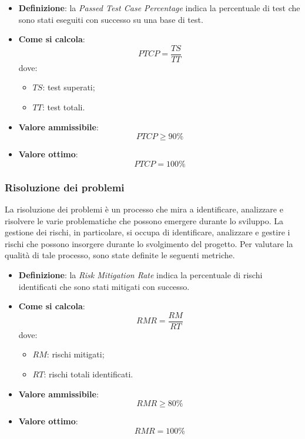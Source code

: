 \begin{itemize}
	\item \textbf{Definizione}: la \textit{Passed Test Case Percentage} indica la percentuale di test che sono stati eseguiti con successo su una base di test.
	\item \textbf{Come si calcola}: \begin{equation*}PTCP = \frac{TS}{TT}\end{equation*} dove:
		\begin{itemize}
			\item $TS$: test superati;
			\item $TT$: test totali.
		\end{itemize}
	\item \textbf{Valore ammissibile}: \begin{equation*}PTCP \geq 90\%\end{equation*}
	\item \textbf{Valore ottimo}: \begin{equation*}PTCP = 100\%\end{equation*}
\end{itemize}



\subsubsection{Risoluzione dei problemi}
La risoluzione dei problemi è un processo che mira a identificare, analizzare e risolvere le varie problematiche che possono emergere durante lo sviluppo. La gestione dei rischi, in particolare, si occupa di identificare, analizzare e gestire i rischi che possono insorgere durante lo svolgimento del progetto. Per valutare la qualità di tale processo, sono state definite le seguenti metriche.

\begin{itemize}
	\item \textbf{Definizione}: la \textit{Risk Mitigation Rate} indica la percentuale di rischi identificati che sono stati mitigati con successo.
	\item \textbf{Come si calcola}: \begin{equation*}RMR = \frac{RM}{RT}\end{equation*} dove:
		\begin{itemize}
			\item $RM$: rischi mitigati;
			\item $RT$: rischi totali identificati.
		\end{itemize}
	\item \textbf{Valore ammissibile}: \begin{equation*}RMR \geq 80\%\end{equation*}
	\item \textbf{Valore ottimo}: \begin{equation*}RMR = 100\%\end{equation*}
\end{itemize}

